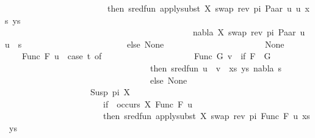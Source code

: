 \begin{isabellebody}
\ \ \ \ \ \ \ \ \ \ \ \ \ \ \ \ \ \ \ \ \ \ \ \ then\ sred{\isacharunderscore}{\kern0pt}fun\ {\isacharparenleft}{\kern0pt}apply{\isacharunderscore}{\kern0pt}subst\ {\isacharbrackleft}{\kern0pt}{\isacharparenleft}{\kern0pt}X{\isacharcomma}{\kern0pt}\ swap\ {\isacharparenleft}{\kern0pt}rev\ pi{\isacharparenright}{\kern0pt}\ {\isacharparenleft}{\kern0pt}Paar\ u{}\ u{}{\isacharparenright}{\kern0pt}{\isacharparenright}{\kern0pt}{\isacharbrackright}{\kern0pt}\ {\isacharparenleft}{\kern0pt}xs{\isacharcomma}{\kern0pt}\ ys{\isacharparenright}{\kern0pt}{\isacharcomma}{\kern0pt}\isanewline
\ \ \ \ \ \ \ \ \ \ \ \ \ \ \ \ \ \ \ \ \ \ \ \ \ \ \ \ \ \ \ \ \ \ \ \ \ \ \ \ \ \ \ \ nabla{\isacharcomma}{\kern0pt}\ {\isacharbrackleft}{\kern0pt}{\isacharparenleft}{\kern0pt}X{\isacharcomma}{\kern0pt}\ swap\ {\isacharparenleft}{\kern0pt}rev\ pi{\isacharparenright}{\kern0pt}\ {\isacharparenleft}{\kern0pt}Paar\ u{}\ u{}{\isacharparenright}{\kern0pt}{\isacharparenright}{\kern0pt}{\isacharbrackright}{\kern0pt}\ {\isasymbullet}\ s{\isacharparenright}{\kern0pt}\isanewline
\ \ \ \ \ \ \ \ \ \ \ \ \ \ \ \ \ \ \ \ \ \ \ \ else\ None\isanewline
\ \ \ \ \ \ \ \ \ \ \ \ \ \ \ \ \ \ \ \ {\isacharbar}{\kern0pt}\ {\isacharunderscore}{\kern0pt}\ {\isasymRightarrow}\ None{\isacharparenright}{\kern0pt}\isanewline
\ \ \ {\isacharbar}{\kern0pt}\ Func\ F\ u\ {\isasymRightarrow}\ {\isacharparenleft}{\kern0pt}case\ t{}\ of\isanewline
\ \ \ \ \ \ \ \ \ \ \ \ \ \ \ \ \ \ \ \ \ Func\ G\ v\ {\isasymRightarrow}\ if\ F\ {\isacharequal}{\kern0pt}\ G\isanewline
\ \ \ \ \ \ \ \ \ \ \ \ \ \ \ \ \ \ \ \ \ \ \ \ \ \ \ \ \ \ \ \ \ \ then\ sred{\isacharunderscore}{\kern0pt}fun\ {\isacharparenleft}{\kern0pt}{\isacharparenleft}{\kern0pt}{\isacharparenleft}{\kern0pt}u\ {\isasymapprox}{\isacharquery}{\kern0pt}\ v{\isacharparenright}{\kern0pt}\ {\isacharhash}{\kern0pt}\ xs{\isacharcomma}{\kern0pt}\ ys{\isacharparenright}{\kern0pt}{\isacharcomma}{\kern0pt}\ nabla{\isacharcomma}{\kern0pt}\ s{\isacharparenright}{\kern0pt}\isanewline
\ \ \ \ \ \ \ \ \ \ \ \ \ \ \ \ \ \ \ \ \ \ \ \ \ \ \ \ \ \ \ \ \ \ else\ None\isanewline
\ \ \ \ \ \ \ \ \ \ \ \ \ \ \ \ \ \ \ {\isacharbar}{\kern0pt}\ Susp\ pi\ X\ {\isasymRightarrow}\isanewline
\ \ \ \ \ \ \ \ \ \ \ \ \ \ \ \ \ \ \ \ \ \ \ if\ {\isasymnot}\ occurs\ X\ {\isacharparenleft}{\kern0pt}Func\ F\ u{\isacharparenright}{\kern0pt}\isanewline
\ \ \ \ \ \ \ \ \ \ \ \ \ \ \ \ \ \ \ \ \ \ \ then\ sred{\isacharunderscore}{\kern0pt}fun\ {\isacharparenleft}{\kern0pt}apply{\isacharunderscore}{\kern0pt}subst\ {\isacharbrackleft}{\kern0pt}{\isacharparenleft}{\kern0pt}X{\isacharcomma}{\kern0pt}\ swap\ {\isacharparenleft}{\kern0pt}rev\ pi{\isacharparenright}{\kern0pt}\ {\isacharparenleft}{\kern0pt}Func\ F\ u{\isacharparenright}{\kern0pt}{\isacharparenright}{\kern0pt}{\isacharbrackright}{\kern0pt}\ {\isacharparenleft}{\kern0pt}xs{\isacharcomma}{\kern0pt}\ ys{\isacharparenright}{\kern0pt}{\isacharcomma}{\kern0pt}\isanewline

\end{isabellebody}
